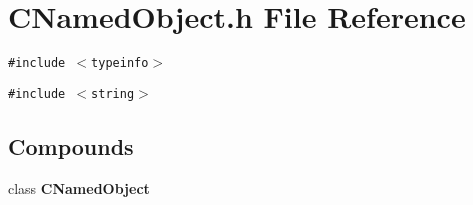 \section{CNamed\-Object.h File Reference}
\label{CNamedObject_8h}
{\tt \#include $<$typeinfo$>$}\par
{\tt \#include $<$string$>$}\par
\subsection*{Compounds}
\begin{CompactItemize}
\item 
class {\bf CNamed\-Object}
\end{CompactItemize}
